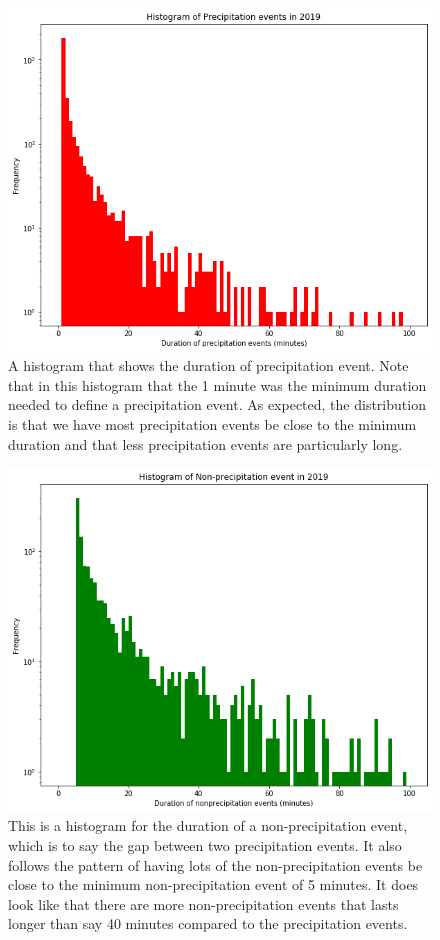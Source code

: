 \begin{figure}[h]
	\centering
	\includegraphics[width=150mm]{../Figures/precip_hist_1min.png}
	\caption{A histogram that shows the duration of precipitation event. Note that in this histogram that the 1 minute was the minimum duration needed to define a precipitation event. As expected, the distribution is that we have most precipitation events be close to the minimum duration and that less precipitation events are particularly long. }
\end{figure}
\begin{figure}[h]
	\centering
	\includegraphics[width=150mm]{../Figures/nonprecip_hist_5min.png}
	\caption{This is a histogram for the duration of a non-precipitation event, which is to say the gap between two precipitation events. It also follows the pattern of having lots of the non-precipitation events be close to the minimum non-precipitation event of 5 minutes. It does look like that there are more non-precipitation events that lasts longer than say 40 minutes compared to the precipitation events. }
\end{figure}
